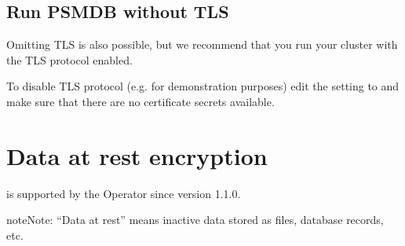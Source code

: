 \documentclass[letterpaper,10pt,english]{sphinxmanual}
\begin{document}
\begin{sphinxVerbatim}[commandchars=\\\{\}]
        
\end{sphinxVerbatim}


\section{Run PSMDB without TLS}
\label{\detokenize{TLS:run-psmdb-without-tls}}
Omitting TLS is also possible, but we recommend that you run your cluster with the TLS protocol enabled.

To disable TLS protocol (e.g. for demonstration purposes) edit the  setting to  and make sure that there are no certificate secrets available.


\chapter{Data at rest encryption}
\label{\detokenize{encryption:data-at-rest-encryption}}\label{\detokenize{encryption::doc}}
 is supported by the Operator since version 1.1.0.

\begin{sphinxadmonition}{note}{Note:}
“Data at rest” means inactive data stored as files, database records, etc.
\end{sphinxadmonition}
\end{document}
